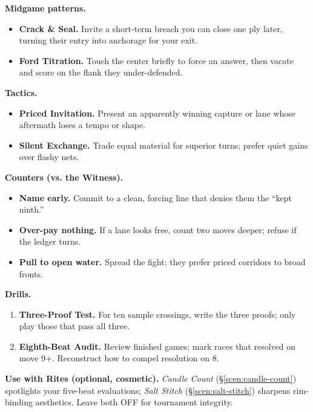 \documentclass[11pt]{article}
\numberwithin{equation}{section} %
\theoremstyle{plain} %
\theoremstyle{definition} %
\theoremstyle{remark} %
\begin{document}
\medskip
\noindent\textbf{Midgame patterns.}
\begin{itemize}\setlength\itemsep{0.25em}
  \item \textbf{Crack \& Seal.} Invite a short-term breach you can close one ply later, turning their entry into anchorage for your exit.
  \item \textbf{Ford Titration.} Touch the center briefly to force an answer, then vacate and score on the flank they under-defended.
\end{itemize}

\medskip
\noindent\textbf{Tactics.}
\begin{itemize}\setlength\itemsep{0.25em}
  \item \textbf{Priced Invitation.} Present an apparently winning capture or lane whose aftermath loses a tempo or shape.
  \item \textbf{Silent Exchange.} Trade equal material for superior turns; prefer quiet gains over flashy nets.
\end{itemize}

\medskip
\noindent\textbf{Counters (vs. the Witness).}
\begin{itemize}\setlength\itemsep{0.25em}
  \item \textbf{Name early.} Commit to a clean, forcing line that denies them the “kept ninth.”
  \item \textbf{Over-pay nothing.} If a lane looks free, count two moves deeper; refuse if the ledger turns.
  \item \textbf{Pull to open water.} Spread the fight; they prefer priced corridors to broad fronts.
\end{itemize}

\medskip
\noindent\textbf{Drills.}
\begin{enumerate}\setlength\itemsep{0.25em}
  \item \textbf{Three-Proof Test.} For ten sample crossings, write the three proofs; only play those that pass all three.
  \item \textbf{Eighth-Beat Audit.} Review finished games; mark races that resolved on move 9+. Reconstruct how to compel resolution on 8.
\end{enumerate}

\medskip
\noindent\textbf{Use with Rites (optional, cosmetic).} \emph{Candle Count} (\S\ref{scen:candle-count}) spotlights your five-beat evaluations; \emph{Salt Stitch} (\S\ref{scen:salt-stitch}) sharpens rim-binding aesthetics. Leave both \textsc{OFF} for tournament integrity.
\end{document}
